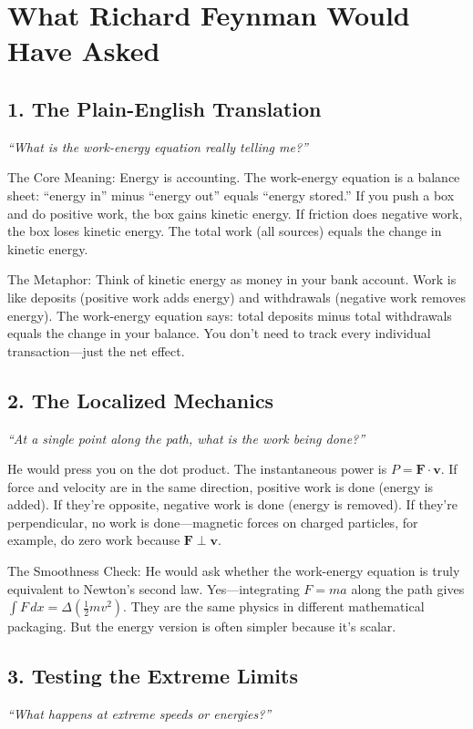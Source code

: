 \section*{What Richard Feynman Would Have Asked}

\subsection*{1. The Plain-English Translation}
\textit{``What is the work-energy equation really telling me?''}

The Core Meaning: Energy is accounting. The work-energy equation is a balance sheet: ``energy in'' minus ``energy out'' equals ``energy stored.'' If you push a box and do positive work, the box gains kinetic energy. If friction does negative work, the box loses kinetic energy. The total work (all sources) equals the change in kinetic energy.

The Metaphor: Think of kinetic energy as money in your bank account. Work is like deposits (positive work adds energy) and withdrawals (negative work removes energy). The work-energy equation says: total deposits minus total withdrawals equals the change in your balance. You don't need to track every individual transaction---just the net effect.

\subsection*{2. The Localized Mechanics}
\textit{``At a single point along the path, what is the work being done?''}

He would press you on the dot product. The instantaneous power is $P = \mathbf{F} \cdot \mathbf{v}$. If force and velocity are in the same direction, positive work is done (energy is added). If they're opposite, negative work is done (energy is removed). If they're perpendicular, no work is done---magnetic forces on charged particles, for example, do zero work because $\mathbf{F} \perp \mathbf{v}$.

The Smoothness Check: He would ask whether the work-energy equation is truly equivalent to Newton's second law. Yes---integrating $F = ma$ along the path gives $\int F \, dx = \Delta(\frac{1}{2}mv^2)$. They are the same physics in different mathematical packaging. But the energy version is often simpler because it's scalar.

\subsection*{3. Testing the Extreme Limits}
\textit{``What happens at extreme speeds or energies?''}

